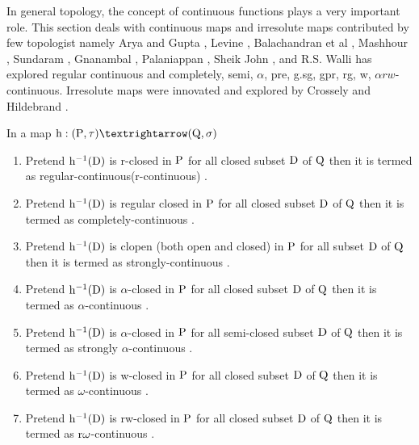 In general topology, the concept of continuous functions plays a very important role. This section deals with continuous maps and irresolute maps contributed by few topologist namely Arya and Gupta \cite{Arya1},  Levine \cite{Levine1}, Balachandran et al \cite{Maki11}, Mashhour \cite{Abd1}, Sundaram \cite{Maki2},  Gnanambal \cite{Gnanambal}, Palaniappan \cite{Palaniappan}, Sheik John \cite{Sheik1}, and R.S. Walli \cite{Wali4} has explored regular continuous and completely, semi,  $\alpha$, pre, g.sg, gpr, rg, w, $\alpha rw$-continuous. Irresolute maps were innovated and explored by Crossely and Hildebrand \cite{Crossley}.

\newpage

\begin{dfn}\label{dfn1.3.1}
In a map $\TSh: (\TSP, \tau) →(\TSQ, \sigma)$
\begin{enumerate}
\item Pretend $\mathrm{h}^{-1}(\mathrm{D})$ is r-closed in $\mathrm{P}$ for all closed subset $\mathrm{D}$ of $\mathrm{Q}$ then it is termed as regular-continuous(r-continuous) \cite{Arya1}. 
\item Pretend $\mathrm{h}^{-1}(\mathrm{D})$ is regular closed in $\mathrm{P}$ for all closed subset $\mathrm{D}$ of $\mathrm{Q}$ then it is termed as completely-continuous \cite{Levine2}. 
\item Pretend $\mathrm{h}^{-1}(\mathrm{D})$ is clopen (both open and closed) in $\mathrm{P}$ for all subset $\mathrm{D}$ of $\mathrm{Q}$ then it is termed as strongly-continuous \cite{Maki11}. 
\item Pretend $\mathrm{h}^{-1}(\mathrm{D})$ is $\alpha$-closed in $\mathrm{P}$ for all closed subset $\mathrm{D}$ of $\mathrm{Q}$ then it is termed as $\alpha$-continuous \cite{Maki11}. 
\item Pretend $\mathrm{h}^{-1}(\mathrm{D})$ is $\alpha$-closed in $\mathrm{P}$ for all semi-closed subset $\mathrm{D}$ of $\mathrm{Q}$ then it is termed as strongly $\alpha$-continuous \cite{Navalagi}. 
\item Pretend $\mathrm{h}^{-1}(\mathrm{D})$ is w-closed in $\mathrm{P}$ for all closed subset $\mathrm{D}$ of $\mathrm{Q}$ then it is termed as $\omega$-continuous \cite{Sheik}. 
\item Pretend $\mathrm{h}^{-1}(\mathrm{D})$ is rw-closed in $\mathrm{P}$ for all closed subset $\mathrm{D}$ of $\mathrm{Q}$ then it is termed as $\mathrm{r}\omega$-continuous \cite{Benchalli}. 
\end{enumerate}
\end{dfn}

